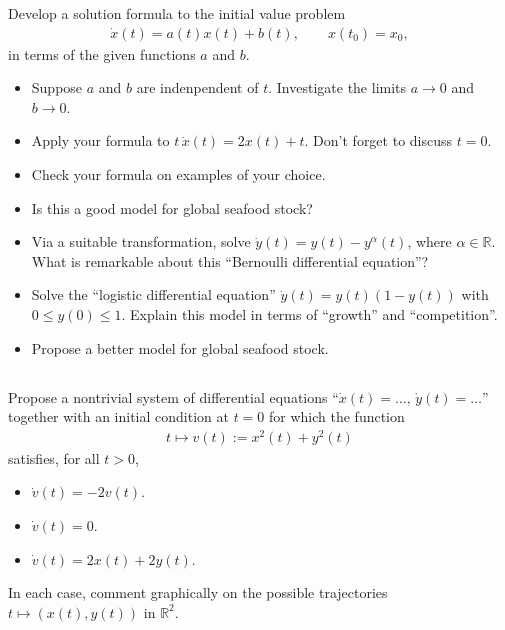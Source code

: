 \documentclass[12pt,a4paper]{article}
\begin{document}
    Develop a solution formula to
    the initial value problem
    \begin{align}
        \dot{x}(t) = a(t) x(t) + b(t)
        ,
        \qquad
        x(t_0) = x_0
        ,
    \end{align}
    in terms of the given functions $a$ and $b$.
    \begin{itemize}
    \item
        Suppose $a$ and $b$ are indenpendent of $t$.
        Investigate the limits $a \to 0$ and $b \to 0$.
    \item
        Apply your formula to $t \, \dot{x}(t) = 2 x(t) + t$.
        Don't forget to discuss $t = 0$.
    \item
        Check your formula on examples of your choice.
    \item
        Is this a good model for global seafood stock?
    \item
        Via a suitable transformation,
        solve 
        $\dot{y}(t) = y(t) - y^\alpha(t)$,
        where $\alpha \in \mathbb{R}$.
        What is remarkable about this 
        ``Bernoulli differential equation''?
    \item
        Solve the ``logistic differential equation''
        $\dot{y}(t) = y(t) (1 - y(t))$
        with $0 \leq y(0) \leq 1$.
        Explain this model
        in terms of ``growth'' and ``competition''.
    \item
        Propose a better model for global seafood stock.
    \end{itemize}

    
    \subsection{}
    
    Propose a nontrivial system of differential equations
    ``$\dot{x}(t) = \ldots$,
    $\dot{y}(t) = \ldots$''
    together with an initial condition at $t = 0$
    for which the function
    \begin{align}
        t \mapsto v(t) := x^2(t) + y^2(t)
    \end{align}
    satisfies, for all $t > 0$,
    \begin{itemize}
    \item
        $\dot{v}(t) = -2 v(t)$.
    \item 
        $\dot{v}(t) = 0$.
    \item
        $\dot{v}(t) = 2 x(t) + 2 y(t)$.
    \end{itemize}
    In each case, 
    comment graphically on the possible trajectories $t \mapsto (x(t), y(t))$ in $\mathbb{R}^2$.
\end{document}
